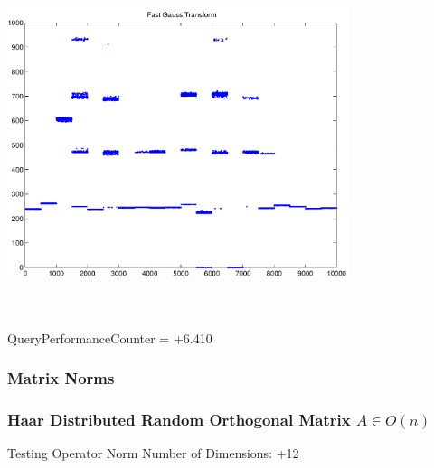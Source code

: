 \documentclass[9pt]{article}
\theoremstyle{plain}
\theoremstyle{definition}
\theoremstyle{remark}
\numberwithin{equation}{section}
\begin{document}
\includegraphics[width=10.0cm,height=10.0cm]{FGT20_Centers.pdf}

QueryPerformanceCounter  =  +6.410
\subsubsection{Matrix Norms}
\subsubsection{Haar Distributed Random Orthogonal Matrix $A \in O(n)$}
 Testing Operator Norm
Number of Dimensions: +12
\end{document}
